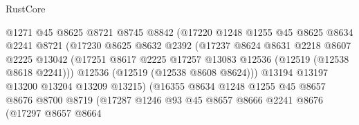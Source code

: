 \begin{lexlean}{RustCore}
\begin{coremodule}
                                @1271
                                @45
                                @8625
                                @8721
                                @8745
                                @8842
                                (@17220
                                  @1248
                                  @1255
                                  @45
                                  @8625
                                  @8634
                                  @2241
                                  @8721
                                  (@17230
                                    @8625
                                    @8632
                                    @2392
                                    (@17237
                                      @8624
                                      @8631
                                      @2218
                                      @8607
                                      @2225
                                      @13042
                                      (@17251
                                        @8617
                                        @2225
                                        @17257
                                        @13083
                                        @12536
                                        (@12519 (@12538 @8618 @2241)))
                                      @12536
                                      (@12519 (@12538 @8608 @8624)))
                                    @13194
                                    @13197
                                    @13200
                                    @13204
                                    @13209
                                    @13215)
                                  (@16355
                                    @8634
                                    @1248
                                    @1255
                                    @45
                                    @8657
                                    @8676
                                    @8700
                                    @8719
                                    (@17287
                                      @1246
                                      @93
                                      @45
                                      @8657
                                      @8666
                                      @2241
                                      @8676
                                      (@17297
                                        @8657
                                        @8664

\end{coremodule}
\end{lexlean}
